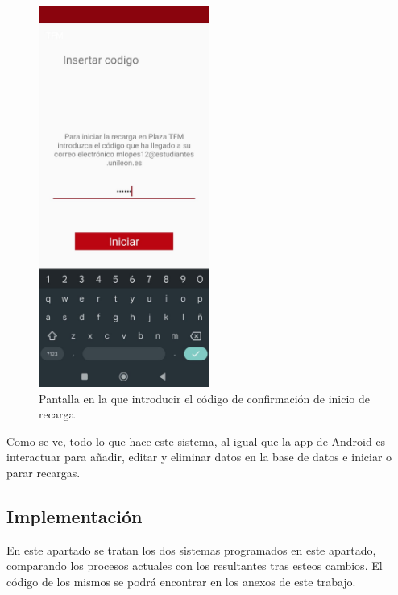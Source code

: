 \documentclass[12pt,a4paper,onecolumn,oneside]{report}
\begin{document}
\begin{figure}[H] 
\centering
  \includegraphics[width=0.5\textwidth]{figuras/design8.png}
  \caption[Pantalla en la que introducir el código de confirmación de inicio de recarga]{Pantalla en la que introducir el código de confirmación de inicio de recarga\\
  }
  \label{fig:design8}
\end{figure}

Como se ve, todo lo que hace este sistema, al igual que la app de Android es interactuar para añadir, editar y eliminar datos en la base de datos e iniciar o parar recargas.


\subsection{Implementación}

En este apartado se tratan los dos sistemas programados en este apartado, comparando los procesos actuales con los resultantes tras esteos cambios. El código de los mismos se podrá encontrar en los anexos de este trabajo.
\end{document}
